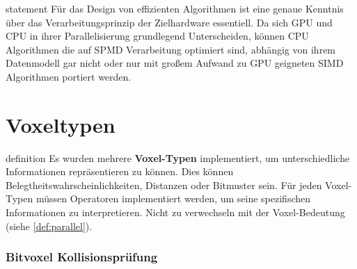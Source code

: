 \begin{infobox}{statement}
  \label{def:parallel}
  Für das Design von effizienten Algorithmen ist eine genaue Kenntnis über das Verarbeitungsprinzip der Zielhardware essentiell.
  Da sich GPU und CPU in ihrer Parallelisierung grundlegend Unterscheiden, können CPU Algorithmen die auf SPMD Verarbeitung optimiert sind, abhängig von ihrem Datenmodell gar nicht oder nur mit großem Aufwand zu GPU geigneten SIMD Algorithmen portiert werden.
\end{infobox}

\section{Voxeltypen}
\begin{infobox}{definition}
  \label{def:voxel_types}
  Es wurden mehrere \textbf{Voxel-Typen} implementiert, um unterschiedliche Informationen repräsentieren zu können.
  Dies können Belegtheitswahrscheinlichkeiten, Distanzen oder Bitmuster sein.
  Für jeden Voxel-Typen müssen Operatoren implementiert werden, um seine spezifischen Informationen zu interpretieren.
  Nicht zu verwechseln mit der Voxel-Bedeutung (siehe \cref{def:parallel}).
\end{infobox}



\subsubsection{Bitvoxel Kollisionsprüfung}
\label{subsec:bitvoxel_col_tests}


